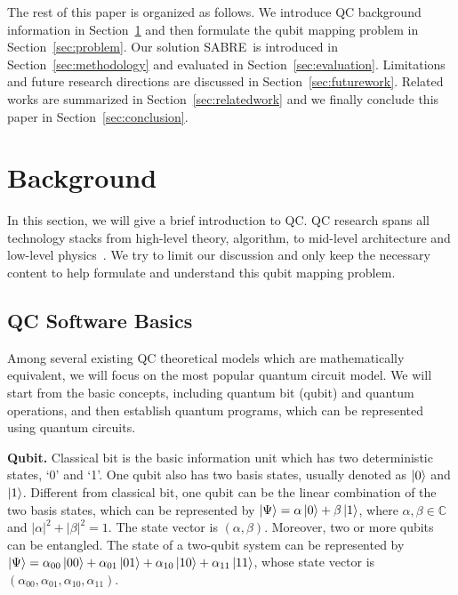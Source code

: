 \documentclass[journal,10pt,twocolumn]{IEEEtran}
\newcommand{\myalgorithmname}{SABRE}
\begin{document}
The rest of this paper is organized as follows. We introduce QC background information in Section~\ref{sec:background} and then 
formulate the qubit mapping problem in Section~\ref{sec:problem}. 
Our solution \myalgorithmname~is introduced in Section~\ref{sec:methodology} and evaluated in Section~\ref{sec:evaluation}. 
Limitations and future research directions are discussed in Section~\ref{sec:futurework}.
Related works are summarized in Section~\ref{sec:relatedwork} and we finally conclude this paper in Section~\ref{sec:conclusion}.

\section{Background}\label{sec:background}
In this section, we will give a brief introduction to QC.
QC research spans all technology stacks from high-level theory, algorithm, to mid-level architecture and low-level physics~\cite{van2013blueprint,chong2017programming,fu2017experimental}.
We try to limit our discussion and only keep the necessary content to help formulate and understand this qubit mapping problem.

\subsection{QC Software Basics}
Among several existing QC theoretical models which are mathematically equivalent, we will focus on the most popular quantum circuit model.%
We will start from the basic concepts, including quantum bit (qubit) and quantum operations, and then establish quantum programs, which can be represented using quantum circuits.

\textbf{Qubit.} Classical bit is the basic information unit which has two deterministic states, `0' and `1'. 
One qubit also has two basis states, usually denoted as $\ket{0}$ and $\ket{1}$.
Different from classical bit, one qubit can be the linear combination of the two basis states, which can be represented by 
$\ket{\Psi} = \alpha\ket{0} + \beta\ket{1}$, where $ \alpha, \beta \in \mathbb{C}$ and $|\alpha|^2 + |\beta|^2 = 1$. The state vector is $(\alpha, \beta)$.
Moreover, two or more qubits can be entangled. The state of a two-qubit system can be represented by $\ket{\Psi} = \alpha_{00}\ket{00} + \alpha_{01}\ket{01} +  \alpha_{10}\ket{10} + \alpha_{11}\ket{11}$, whose state vector is $(\alpha_{00},\alpha_{01},\alpha_{10},\alpha_{11})$.
\end{document}

